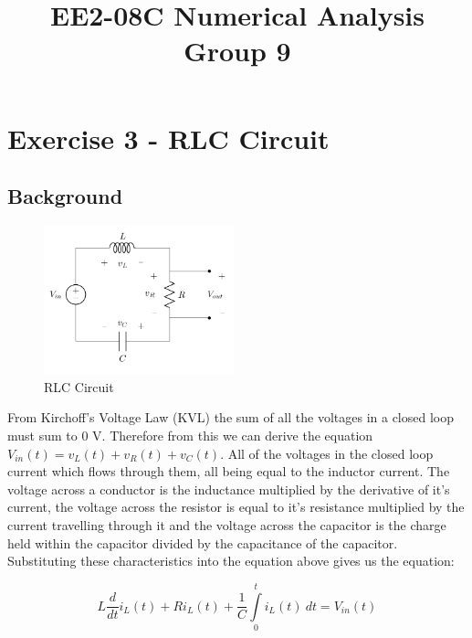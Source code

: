 \documentclass[11pt,a4paper]{article}
\date{}
\author{}
\begin{document}
\vspace{-20mm}
\title{\textbf{EE2-08C Numerical Analysis} \\ Group 9\vspace{-17mm}}
\maketitle
\tableofcontents
\pagebreak
\section{Exercise 3 - RLC Circuit}\vspace{-1mm}
\subsection{Background}

\begin{figure}
\vspace{-10mm}
  		\includegraphics[width=0.49\textwidth]{Ex3_Figs/RLC.png}
\vspace{-6mm}
  	\caption{RLC Circuit}
  	\label{fig:RLC}
\end{figure}

From Kirchoff's Voltage Law (KVL) the sum of all the voltages in a closed loop must sum to 0 V. Therefore from this we can derive the equation $V_{in}(t) = v_L(t)+v_R(t)+v_C(t)$. All of the voltages in the closed loop current which flows through them, all being equal to the inductor current. The voltage across a conductor is the inductance multiplied by the derivative of it's current, the voltage across the resistor is equal to it's resistance multiplied by the current travelling through it and the voltage across the capacitor is the charge held within the capacitor divided by the capacitance of the capacitor. Substituting these characteristics into the equation above gives us the equation:

\[ L \frac{d}{dt}i_L(t) + R i_L(t) + \frac{1}{C}\int\limits_0^t i_L(t) \ dt = V_{in}(t)\]
\end{document}
